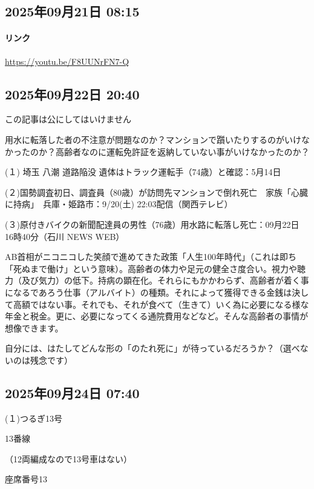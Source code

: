 \subsection*{2025年09月21日 08:15}

\paragraph{リンク}
\url{https://youtu.be/F8UUNrFN7-Q}

\subsection*{2025年09月22日 20:40}

この記事は公にしてはいけません

用水に転落した者の不注意が問題なのか？マンションで躓いたりするのがいけなかったのか？高齢者なのに運転免許証を返納していない事がいけなかったのか？

(１) 埼玉 八潮 道路陥没 遺体はトラック運転手（74歳）と確認：5月14日

(２)国勢調査初日、調査員（80歳）が訪問先マンションで倒れ死亡　家族「心臓に持病」　兵庫・姫路市：9/20(土) 22:03配信（関西テレビ）

(３)原付きバイクの新聞配達員の男性（76歳）用水路に転落し死亡：09月22日　16時40分（石川 NEWS WEB）

AB首相がニコニコした笑顔で進めてきた政策「人生100年時代」（これは即ち「死ぬまで働け」という意味）。高齢者の体力や足元の健全さ度合い。視力や聴力（及び気力）の低下。持病の顕在化。それらにもかかわらず、高齢者が着く事になるであろう仕事（アルバイト）の種類。それによって獲得できる金銭は決して高額ではない事。それでも、それが食べて（生きて）いく為に必要になる様な年金と税金。更に、必要になってくる通院費用などなど。そんな高齢者の事情が想像できます。

自分には、はたしてどんな形の「のたれ死に」が待っているだろうか？（選べないのは残念です）

\subsection*{2025年09月24日 07:40}

(１)つるぎ13号

13番線

（12両編成なので13号車はない）

座席番号13

